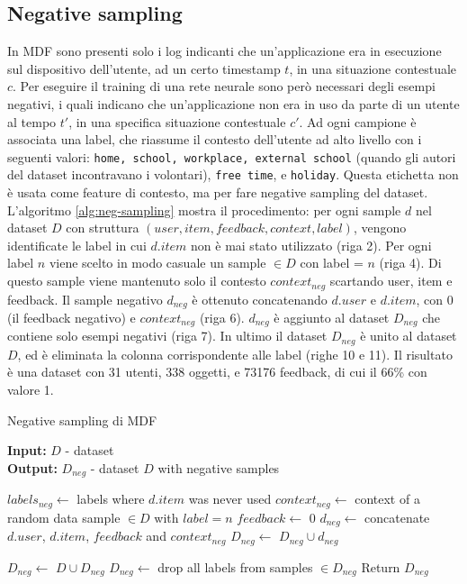 \documentclass[12pt,italian]{report}
\begin{document}
\subsection{Negative sampling}
In MDF sono presenti solo i log indicanti che un'applicazione era in esecuzione sul dispositivo dell'utente, ad un certo timestamp $t$, in una situazione contestuale $c$. Per eseguire il training di una rete neurale sono però necessari degli esempi negativi, i quali indicano che un'applicazione non era in uso da parte di un utente al tempo $t'$, in una specifica situazione contestuale $c'$. Ad ogni campione è associata una label, che riassume il contesto dell'utente ad alto livello con i seguenti valori: \texttt{home, school, workplace, external school} (quando gli autori del dataset incontravano i volontari), \texttt{free time}, e \texttt{holiday}. Questa etichetta non è usata come feature di contesto, ma per fare negative sampling del dataset. 
L'algoritmo \ref{alg:neg-sampling} mostra il procedimento: per ogni sample $d$ nel dataset $D$ con struttura $(user, item, feedback, context, label)$, vengono identificate le label in cui $d.item$ non è mai stato utilizzato (riga 2). Per ogni label $n$ viene scelto in modo casuale un sample $\in D$ con label = $n$ (riga 4). Di questo sample viene mantenuto solo il contesto $context_{neg}$ scartando user, item e feedback. Il sample negativo $d_{neg}$ è ottenuto concatenando $d.user$ e $d.item$, con 0 (il feedback negativo) e $context_{neg}$ (riga 6).  $d_{neg}$ è aggiunto al dataset $D_{neg}$ che contiene solo esempi negativi (riga 7). In ultimo il dataset $D_{neg}$ è unito al dataset $D$, ed è eliminata la colonna corrispondente alle label (righe 10 e 11). Il risultato è una dataset con 31 utenti, 338 oggetti, e 73176 feedback, di cui il 66\% con valore 1.

\begin{algorithm}
\caption{Negative sampling di MDF}
\label{alg:neg-sampling}
 \hspace*{\algorithmicindent} \textbf{Input:} $D$ - dataset \\
 \hspace*{\algorithmicindent} \textbf{Output:} $D_{neg}$ - dataset 
$D$ with negative samples \\ 
\begin{algorithmic}[1]

	\STATE $labels_{neg} \leftarrow$ labels where $d.item$ was never used
		\STATE $context_{neg} \leftarrow$ context of a random data sample  $\in D$ with $label = n$
		\STATE $feedback \leftarrow$ 0
		\STATE $d_{neg} \leftarrow$ concatenate $d.user$, $d.item$, $feedback$ and $context_{neg}$
		\STATE $D_{neg} \leftarrow$ $D_{neg} \cup d_{neg}$ 
		
	\ENDFOR
\ENDFOR

\STATE $D_{neg} \leftarrow$ $D \cup D_{neg}$
\STATE $D_{neg} \leftarrow$ drop all labels from samples $ \in D_{neg}$
\STATE Return $D_{neg}$

\end{algorithmic}
\end{algorithm}
\end{document}
